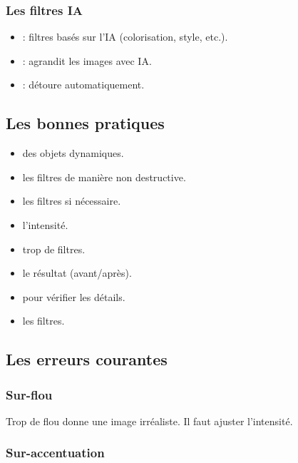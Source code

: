 \subsubsection{Les filtres IA}

\begin{itemize}
    \item {} : filtres basés sur l'IA (colorisation, style, etc.).
    \item {} : agrandit les images avec IA.
    \item {} : détoure automatiquement.
\end{itemize}

\subsection{Les bonnes pratiques}

\begin{itemize}
    \item {} des objets dynamiques.
    \item {} les filtres de manière non destructive.
    \item {} les filtres si nécessaire.
    \item {} l'intensité.
    \item {} trop de filtres.
    \item {} le résultat (avant/après).
    \item {} pour vérifier les détails.
    \item {} les filtres.
\end{itemize}

\subsection{Les erreurs courantes}

\subsubsection{Sur-flou}

Trop de flou donne une image irréaliste. Il faut ajuster l'intensité.

\subsubsection{Sur-accentuation}

